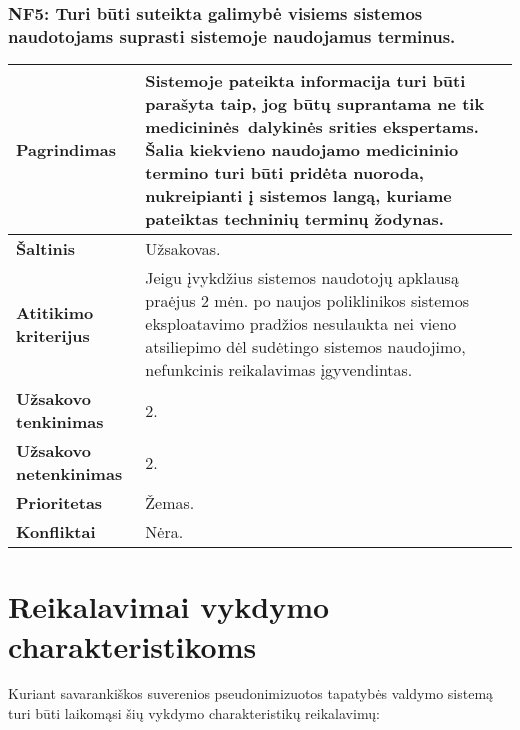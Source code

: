 \documentclass[12pt]{article}
\begin{document}
\subsubsection*{NF5: Turi būti suteikta galimybė visiems sistemos naudotojams
suprasti sistemoje naudojamus terminus.}
\label{sec:NF5}
\begin{table}[htb!]
    \captionsetup{justification=centering}
    \begin{tabular}{|m{4.9cm}|m{11cm}|}
        \hline
        \raggedleft \textbf{\cellcolor{orange!30}Pagrindimas} &
        Sistemoje pateikta informacija turi būti parašyta taip, jog būtų
        suprantama ne tik medicininės dalykinės srities ekspertams. Šalia
        kiekvieno naudojamo medicininio termino turi būti pridėta nuoroda,
        nukreipianti į sistemos langą, kuriame pateiktas techninių terminų
        žodynas. \\
        \hline
        \raggedleft \textbf{\cellcolor{orange!30}Šaltinis} & Užsakovas. \\
        \hline
        \raggedleft \textbf{\cellcolor{orange!30}Atitikimo kriterijus} & 
        Jeigu įvykdžius sistemos naudotojų apklausą praėjus 2 mėn. po naujos
        poliklinikos sistemos eksploatavimo pradžios nesulaukta nei vieno
        atsiliepimo dėl sudėtingo sistemos naudojimo, nefunkcinis reikalavimas
        įgyvendintas. \\
        \hline
        \raggedleft \textbf{\cellcolor{orange!30}Užsakovo tenkinimas} & 2. \\
        \hline
        \raggedleft \textbf{\cellcolor{orange!30}Užsakovo netenkinimas} & 2. \\
        \hline
        \raggedleft \textbf{\cellcolor{orange!30}Prioritetas} & Žemas. \\
        \hline
        \raggedleft \textbf{\cellcolor{orange!30}Konfliktai} & Nėra. \\
        \hline
    \end{tabular}
\end{table}

\section{Reikalavimai vykdymo charakteristikoms}
Kuriant savarankiškos suverenios pseudonimizuotos tapatybės valdymo sistemą
turi būti laikomąsi šių vykdymo charakteristikų reikalavimų:
\end{document}
